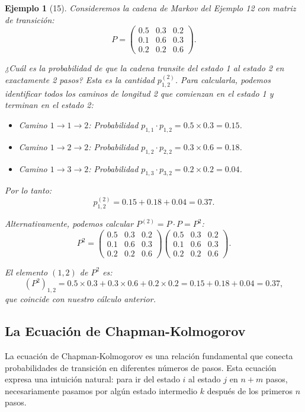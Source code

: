 \documentclass[12pt]{book}
\newtheorem{example}{Ejemplo}[chapter]
\begin{document}
\begin{example}[15]
Consideremos la cadena de Markov del Ejemplo 12 con matriz de transición:
\[
P = \begin{pmatrix}
0.5 & 0.3 & 0.2 \\
0.1 & 0.6 & 0.3 \\
0.2 & 0.2 & 0.6
\end{pmatrix}.
\]

¿Cuál es la probabilidad de que la cadena transite del estado 1 al estado 2 en exactamente 2 pasos? Esta es la cantidad $p_{1,2}^{(2)}$. Para calcularla, podemos identificar todos los caminos de longitud 2 que comienzan en el estado 1 y terminan en el estado 2:
\begin{itemize}
    \item Camino $1 \to 1 \to 2$: Probabilidad $p_{1,1} \cdot p_{1,2} = 0.5 \times 0.3 = 0.15$.
    \item Camino $1 \to 2 \to 2$: Probabilidad $p_{1,2} \cdot p_{2,2} = 0.3 \times 0.6 = 0.18$.
    \item Camino $1 \to 3 \to 2$: Probabilidad $p_{1,3} \cdot p_{3,2} = 0.2 \times 0.2 = 0.04$.
\end{itemize}

Por lo tanto:
\[
p_{1,2}^{(2)} = 0.15 + 0.18 + 0.04 = 0.37.
\]

Alternativamente, podemos calcular $P^{(2)} = P \cdot P = P^2$:
\[
P^2 = \begin{pmatrix}
0.5 & 0.3 & 0.2 \\
0.1 & 0.6 & 0.3 \\
0.2 & 0.2 & 0.6
\end{pmatrix} \begin{pmatrix}
0.5 & 0.3 & 0.2 \\
0.1 & 0.6 & 0.3 \\
0.2 & 0.2 & 0.6
\end{pmatrix}.
\]

El elemento $(1,2)$ de $P^2$ es:
\[
(P^2)_{1,2} = 0.5 \times 0.3 + 0.3 \times 0.6 + 0.2 \times 0.2 = 0.15 + 0.18 + 0.04 = 0.37,
\]
que coincide con nuestro cálculo anterior.
\end{example}

\subsection*{La Ecuación de Chapman-Kolmogorov}

La ecuación de Chapman-Kolmogorov es una relación fundamental que conecta probabilidades de transición en diferentes números de pasos. Esta ecuación expresa una intuición natural: para ir del estado $i$ al estado $j$ en $n + m$ pasos, necesariamente pasamos por algún estado intermedio $k$ después de los primeros $n$ pasos.
\end{document}
